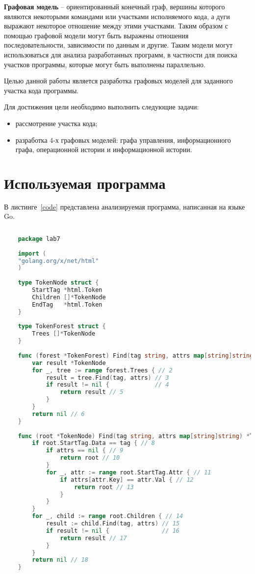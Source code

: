 
\textbf{Графовая модель} -- ориентированный конечный граф, вершины которого являются некоторыми командами или участками исполняемого кода, а дуги выражают некоторое отношение между этими участками. Таким образом с помощью графовой модели могут быть выражены отношения последовательности, зависимости по данным и другие. Таким модели могут использоваться для анализа разработанных программ, в частности для поиска участков программы, которые могут быть выполнены параллельно.

Целью данной работы является разработка графовых моделей для заданного участка кода программы.

Для достижения цели необходимо выполнить следующие задачи:
\begin{itemize}
	\item рассмотрение участка кода;
	\item разработка 4-х графовых моделей: графа управления, информационного графа, операционной истории и информационной истории.
\end{itemize}
\vspace{20mm}
{\let\clearpage\relax \chapter{Используемая программа}}

В листинге~\ref{code} представлена анализируемая программа, написанная на языке Go.

\begin{lstlisting}[label=code,caption={Данные, передающиеся между частями конвейера},language=go]
	
	package lab7
	
	import (
	"golang.org/x/net/html"
	)
	
	type TokenNode struct {
		StartTag *html.Token
		Children []*TokenNode
		EndTag   *html.Token
	}
	
	type TokenForest struct {
		Trees []*TokenNode
	}
	
	func (forest *TokenForest) Find(tag string, attrs map[string]string) *TokenNode { // 1
		var result *TokenNode
		for _, tree := range forest.Trees { // 2
			result = tree.Find(tag, attrs) // 3
			if result != nil {             // 4
				return result // 5
			}
		}
		return nil // 6
	}
	
	func (root *TokenNode) Find(tag string, attrs map[string]string) *TokenNode { // 7
		if root.StartTag.Data == tag { // 8
			if attrs == nil { // 9
				return root // 10
			}
			for _, attr := range root.StartTag.Attr { // 11
				if attrs[attr.Key] == attr.Val { // 12
					return root // 13
				}
			}
		}
		for _, child := range root.Children { // 14
			result := child.Find(tag, attrs) // 15
			if result != nil {               // 16
				return result // 17
			}
		}
		return nil // 18
	}
\end{lstlisting}

